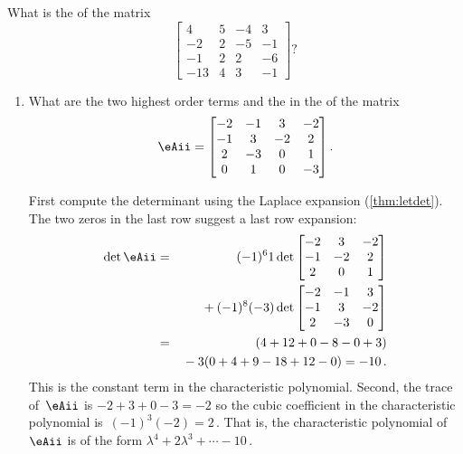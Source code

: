 \begin{activity}
What is the  of the matrix
\begin{equation*}
\begin{bmatrix} 4&5&-4&3
\\-2&2&-5&-1
\\-1&2&2&-6
\\-13&4&3&-1 \end{bmatrix}?
\end{equation*}
\end{activity}



\begin{example} 
\begin{enumerate}
\item What are the two highest order terms and the  in the  of the matrix
\begin{equation*}
\eAii=\begin{bmatrix}-2&-1&3&-2
\\-1&3&-2&2
\\2&-3&0&1
\\0&1&0&-3  \end{bmatrix}.
\end{equation*}
\begin{solution} 
First compute the determinant using the Laplace expansion (\autoref{thm:letdet}).  
The two zeros in the last row suggest a last row expansion:
\begin{eqnarray*}
\det \eAii&=&(-1)^61\det\begin{bmatrix}-2&3&-2
\\-1&-2&2
\\2&0&1 \end{bmatrix}
\\&&{}
+(-1)^8(-3)\det\begin{bmatrix}-2&-1&3
\\-1&3&-2
\\2&-3&0\end{bmatrix}
\\&=&(4+12+0-8-0+3)
\\&&{}-3(0+4+9-18+12-0)
=-10\,.
\end{eqnarray*}
This is the constant term in the characteristic polynomial.
Second, the trace of~\(\eAii\) is \(-2+3+0-3=-2\) so the cubic coefficient in the characteristic polynomial is~\((-1)^3(-2)=2\)\,.
That is, the characteristic polynomial of~\(\eAii\) is of the form \(\lambda^4+2\lambda^3+\cdots-10\)\,.
\end{solution}


\end{enumerate}
\end{example}
